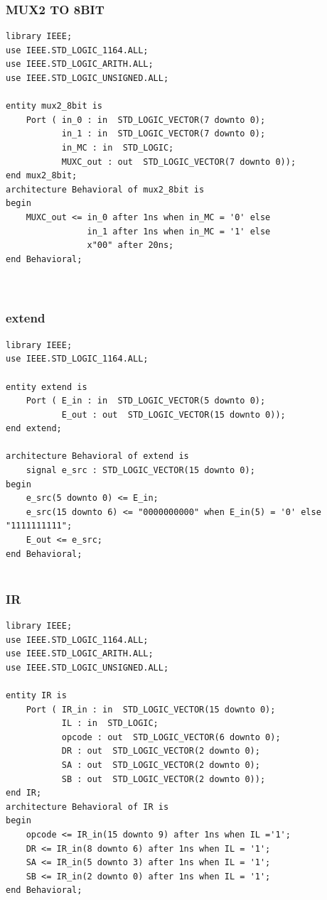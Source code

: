 \documentclass{article}
\begin{document}
\subsubsection{MUX2 TO 8BIT}\label{sec:intro}

\begin{lstlisting}
library IEEE;
use IEEE.STD_LOGIC_1164.ALL;
use IEEE.STD_LOGIC_ARITH.ALL;
use IEEE.STD_LOGIC_UNSIGNED.ALL;

entity mux2_8bit is
    Port ( in_0 : in  STD_LOGIC_VECTOR(7 downto 0);
           in_1 : in  STD_LOGIC_VECTOR(7 downto 0);
           in_MC : in  STD_LOGIC;
           MUXC_out : out  STD_LOGIC_VECTOR(7 downto 0));
end mux2_8bit;
architecture Behavioral of mux2_8bit is
begin
	MUXC_out <= in_0 after 1ns when in_MC = '0' else
				in_1 after 1ns when in_MC = '1' else
				x"00" after 20ns;
end Behavioral;

   
\end{lstlisting}
\pagebreak


\subsubsection{extend}\label{sec:intro}
\begin{lstlisting}
library IEEE;
use IEEE.STD_LOGIC_1164.ALL;

entity extend is
    Port ( E_in : in  STD_LOGIC_VECTOR(5 downto 0);
           E_out : out  STD_LOGIC_VECTOR(15 downto 0));
end extend;

architecture Behavioral of extend is
	signal e_src : STD_LOGIC_VECTOR(15 downto 0);
begin
	e_src(5 downto 0) <= E_in;
	e_src(15 downto 6) <= "0000000000" when E_in(5) = '0' else "1111111111";
	E_out <= e_src;
end Behavioral;
   
\end{lstlisting}
\pagebreak

\subsubsection{IR}\label{sec:intro}
\begin{lstlisting}
library IEEE;
use IEEE.STD_LOGIC_1164.ALL;
use IEEE.STD_LOGIC_ARITH.ALL;
use IEEE.STD_LOGIC_UNSIGNED.ALL;

entity IR is
    Port ( IR_in : in  STD_LOGIC_VECTOR(15 downto 0);
           IL : in  STD_LOGIC;
           opcode : out  STD_LOGIC_VECTOR(6 downto 0);
           DR : out  STD_LOGIC_VECTOR(2 downto 0);
           SA : out  STD_LOGIC_VECTOR(2 downto 0);
           SB : out  STD_LOGIC_VECTOR(2 downto 0));
end IR;
architecture Behavioral of IR is
begin
	opcode <= IR_in(15 downto 9) after 1ns when IL ='1';
	DR <= IR_in(8 downto 6) after 1ns when IL = '1';
	SA <= IR_in(5 downto 3) after 1ns when IL = '1';
	SB <= IR_in(2 downto 0) after 1ns when IL = '1';
end Behavioral;
   
\end{lstlisting}
\pagebreak
\end{document}
